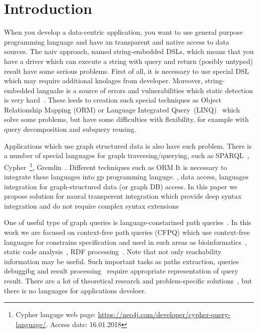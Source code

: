 \section{Introduction}

When you develop a data-centric application, you want to use general purpose programming language and have an transparent and native access to data sources.
The naiv approach, named string-embedded DSLs, which means that you have a driver which can execute a string with query and return (posibly untyped) result have some serious problems.
First of all, it is necessary to use special DSL which may require additional knolages from developer.
Moreover, string-embedded languahe is a source of errors and vulnerabilities which static detection is very hard~\cite{stringEmbeddedLanguagesProblem}.  
These leeds to creation such special techniques as Object Relationship Mapping (ORM) or Language Integrated Query~(LINQ)~\cite{LINQ1, LINQ2} which solve some problems, but have some difficulties with flexibility, for example with query decomposition and subquery reusing.


Applications which use graph structured data is also have such problem. 
There is a number of special languages for graph traversing/querying, such as SPARQL~\cite{sparql}, Cypher~\footnote{Cypher languge web page: \url{https://neo4j.com/developer/cypher-query-language/}. Access date: 16.01.2018}, Gremlin~\cite{gremlin}.
Different techniques such as ORM
It is necessary to integrate these languages into gp programming languge.
, data access, languages integration for graph-structured data (or graph DB) access.
In this paper we propose solution for naural transperent integration which provide deep syntax integration and do not require complex syntax extensions 

One of useful type of graph queries is language-constarined path queries~\cite{FLCpathProblem}.
In this work we are focused on context-free path queries (CFPQ) which use context-free languages for constrains specification and used in such areas as bioinformatics~\cite{GraphQueryWithEarley}, static code analysis~\cite{Reps, Zheng, LabelFlowCFLReachability, specificationCFLReachability}, RDF processing~\cite{CFGonRDF}. 
Note that not only reachability information may be useful.
Such important tasks as paths extraction, queries debuggibg and result processing~\cite{structForDebugging} require appropriate representation of query result.
There are a lot of theoretical research and problem-specific solutions~\cite{Yannakakis, ConjCFPathQuery, Hellings16, QueryGraphWithData, RegularDBQuery, GraphQueryWithEarley, graphDB},
 but there is no languages for applications develoer.



